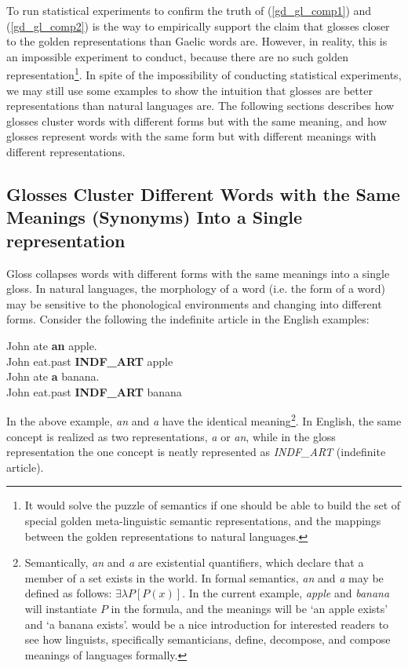 \documentclass[final]{ua-thesis}
\numberwithin{equation}{section}
\begin{document}
To run statistical experiments to confirm the truth of (\ref{gd_gl_comp1}) and (\ref{gd_gl_comp2}) is the way to empirically support the claim that glosses closer to the golden representations than Gaelic words are. 
However, in reality, this is an impossible experiment to conduct, because there are no such golden representation\footnote{It would solve the puzzle of semantics if one should be able to build the set of special golden meta-linguistic semantic representations, and the mappings between the golden representations to natural languages.}.
In spite of the impossibility of conducting statistical experiments, we may still use some examples to show the intuition that glosses are better representations than natural languages are. The following sections describes how glosses cluster words with different forms but with the same meaning, and how glosses represent words with the same form but with different meanings with different representations. 

\subsection{Glosses Cluster Different Words with the Same Meanings (Synonyms) Into a Single representation}\label{sec:cluster}
Gloss collapses words with different forms with the same meanings into a single gloss. In natural languages, the morphology of a word (i.e. the form of a word) may be sensitive to the phonological environments and changing into different forms. Consider the following the indefinite article in the English examples: 

\begin{exe}  
\ex \gll John ate \textbf{an} apple.\\
	John eat.past	\textbf{INDF\_ART} apple\\
\ex \gll John ate \textbf{a} banana.\\
	John eat.past   \textbf{INDF\_ART} banana\\
\end{exe}

In the above example, \textit{an} and \textit{a} have the identical meaning\footnote{Semantically, \textit{an} and \textit{a} are existential quantifiers, which declare that a member of a set exists in the world. In formal semantics, \textit{an} and \textit{a} may be defined as follows: $\exists\lambda P[P(x)]$. In the current example, \textit{apple} and \textit{banana} will instantiate $P$ in the formula, and the meanings will be `an apple exists' and `a banana exists'. \citet{kratzer1998semantics} would be a nice introduction for interested readers to see how linguists, specifically semanticians, define, decompose, and compose meanings of languages formally.}. 
In English, the same concept is realized as two representations, \textit{a} or \textit{an}, while in the gloss representation the one concept is neatly represented as \textit{INDF\_ART} (indefinite article). 
\end{document}
